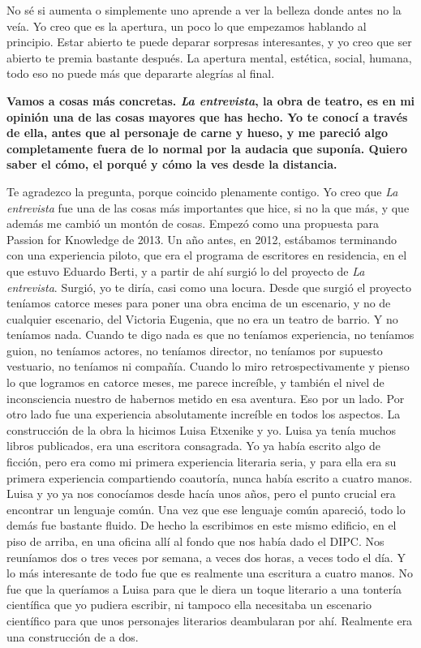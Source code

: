 \documentclass[11pt,a4paper]{article}
\newcommand{\preg}[1]{\textbf{#1}}
\begin{document}
No sé si aumenta o simplemente uno aprende a ver la belleza donde antes no la veía. Yo creo que es la apertura, un poco lo que empezamos hablando al principio. Estar abierto te puede deparar sorpresas interesantes, y yo creo que ser abierto te premia bastante después. La apertura mental, estética, social, humana, todo eso no puede más que depararte alegrías al final.

\preg{Vamos a cosas más concretas. \emph{La entrevista}, la obra de teatro, es en mi opinión una de las cosas mayores que has hecho. Yo te conocí a través de ella, antes que al personaje de carne y hueso, y me pareció algo completamente fuera de lo normal por la audacia que suponía. Quiero saber el cómo, el porqué y cómo la ves desde la distancia.}

Te agradezco la pregunta, porque coincido plenamente contigo. Yo creo que \emph{La entrevista} fue una de las cosas más importantes que hice, si no la que más, y que además me cambió un montón de cosas. Empezó como una propuesta para Passion for Knowledge de 2013. Un año antes, en 2012, estábamos terminando con una experiencia piloto, que era el programa de escritores en residencia, en el que estuvo Eduardo Berti, y a partir de ahí surgió lo del proyecto de \emph{La entrevista}. Surgió, yo te diría, casi como una locura. Desde que surgió el proyecto teníamos catorce meses para poner una obra encima de un escenario, y no de cualquier escenario, del Victoria Eugenia, que no era un teatro de barrio. Y no teníamos nada. Cuando te digo nada es que no teníamos experiencia, no teníamos guion, no teníamos actores, no teníamos director, no teníamos por supuesto vestuario, no teníamos ni compañía. Cuando lo miro retrospectivamente y pienso lo que logramos en catorce meses, me parece increíble, y también el nivel de inconsciencia nuestro de habernos metido en esa aventura. Eso por un lado. Por otro lado fue una experiencia absolutamente increíble en todos los aspectos. La construcción de la obra la hicimos Luisa Etxenike y yo. Luisa ya tenía muchos libros publicados, era una escritora consagrada. Yo ya había escrito algo de ficción, pero era como mi primera experiencia literaria seria, y para ella era su primera experiencia compartiendo coautoría, nunca había escrito a cuatro manos. Luisa y yo ya nos conocíamos desde hacía unos años, pero el punto crucial era encontrar un lenguaje común. Una vez que ese lenguaje común apareció, todo lo demás fue bastante fluido. De hecho la escribimos en este mismo edificio, en el piso de arriba, en una oficina allí al fondo que nos había dado el DIPC. Nos reuníamos dos o tres veces por semana, a veces dos horas, a veces todo el día. Y lo más interesante de todo fue que es realmente una escritura a cuatro manos. No fue que la queríamos a Luisa para que le diera un toque literario a una tontería científica que yo pudiera escribir, ni tampoco ella necesitaba un escenario científico para que unos personajes literarios deambularan por ahí. Realmente era una construcción de a dos.
\end{document}
